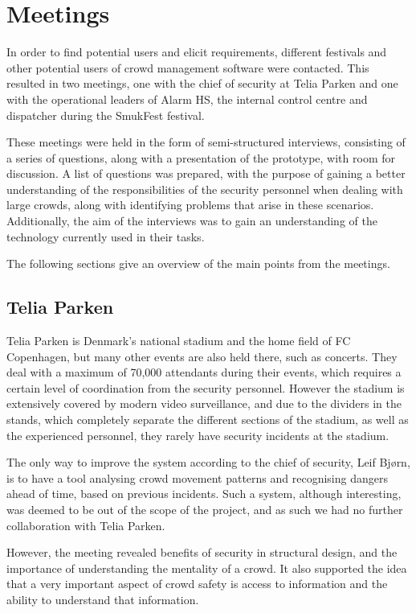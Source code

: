 \section{Meetings} \label{sec:s1_meetings}
In order to find potential users and elicit requirements, different festivals and other potential users of crowd management software were contacted. This resulted in two meetings, one with the chief of security at Telia Parken and one with the operational leaders of Alarm HS, the internal control centre and dispatcher during the SmukFest festival. 

These meetings were held in the form of semi-structured interviews, consisting of a series of questions, along with a presentation of the prototype, with room for discussion. A list of questions was prepared, with the purpose of gaining a better understanding of the responsibilities of the security personnel when dealing with large crowds, along with identifying problems that arise in these scenarios. Additionally, the aim of the interviews was to gain an understanding of the technology currently used in their tasks.   

The following sections give an overview of the main points from the meetings.

\subsection{Telia Parken}\label{sub:telia_parken_meeting}
Telia Parken is Denmark's national stadium and the home field of FC Copenhagen, but many other events are also held there, such as concerts. They deal with a maximum of 70,000 attendants during their events, which requires a certain level of coordination from the security personnel. However the stadium is extensively covered by modern video surveillance, and due to the dividers in the stands, which completely separate the different sections of the stadium, as  well as the experienced personnel, they rarely have security incidents at the stadium.

The only way to improve the system according to the chief of security, Leif Bjørn, is to have a tool analysing crowd movement patterns and recognising dangers ahead of time, based on previous incidents. Such a system, although interesting, was deemed to be out of the scope of the project, and as such we had no further collaboration with Telia Parken.

However, the meeting revealed benefits of security in structural design, and the importance of understanding the mentality of a crowd. It also supported the idea that a very important aspect of crowd safety is access to information and the ability to understand that information.

